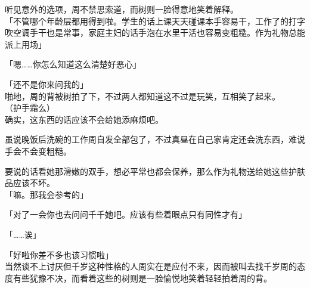 听见意外的选项，周不禁思索道，而树则一脸得意地笑着解释。\\

「不管哪个年龄层都用得到啦。学生的话上课天天碰课本手容易干，工作了的打字吹空调手干也是常事，家庭主妇的话手泡在水里干活也容易变粗糙。作为礼物总能派上用场」

「嗯……你怎么知道这么清楚好恶心」

「还不是你来问我的」\\

啪地，周的背被树拍了下，不过两人都知道这不过是玩笑，互相笑了起来。\\

（护手霜么）\\

确实，这东西的话应该不会给她添麻烦吧。

虽说晚饭后洗碗的工作周自发全部包了，不过真昼在自己家肯定还会洗东西，难说手会不会变粗糙。

要说的话看她那滑嫩的双手，想必平常也都会保养，那么作为礼物送给她这些护肤品应该不坏。\\

「嘛。那我会参考的」

「对了一会你也去问问千千她吧。应该有些着眼点只有同性才有」

「……诶」

「好啦你差不多也该习惯啦」\\

当然谈不上讨厌但千岁这种性格的人周实在是应付不来，因而被叫去找千岁周的态度有些犹豫不决，而看着这些的树则是一脸愉悦地笑着轻轻拍着周的背。
